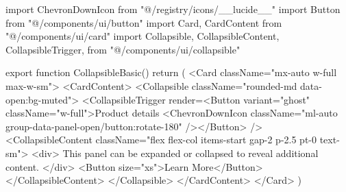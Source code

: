 import { ChevronDownIcon } from "@/registry/icons/__lucide__"
import { Button } from "@/components/ui/button"
import { Card, CardContent } from "@/components/ui/card"
import {
  Collapsible,
  CollapsibleContent,
  CollapsibleTrigger,
} from "@/components/ui/collapsible"

export function CollapsibleBasic() {
  return (
    <Card className="mx-auto w-full max-w-sm">
      <CardContent>
        <Collapsible className="rounded-md data-open:bg-muted">
          <CollapsibleTrigger render={<Button variant="ghost" className="w-full">Product details
            <ChevronDownIcon className="ml-auto group-data-panel-open/button:rotate-180" /></Button>} />
          <CollapsibleContent className="flex flex-col items-start gap-2 p-2.5 pt-0 text-sm">
            <div>
              This panel can be expanded or collapsed to reveal additional
              content.
            </div>
            <Button size="xs">Learn More</Button>
          </CollapsibleContent>
        </Collapsible>
      </CardContent>
    </Card>
  )
}
